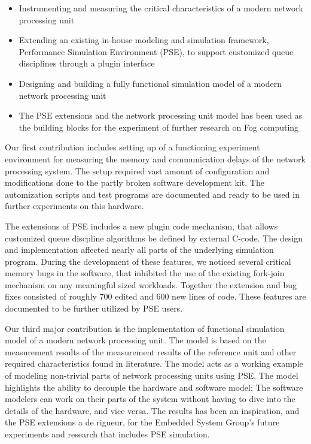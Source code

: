\begin{itemize}
\item Instrumenting and measuring the critical characteristics of a modern network processing unit
\item Extending an existing in-house modeling and simulation framework, Performance Simulation Environment (PSE), to support customized queue disciplines through a plugin interface %
\item Designing and building a fully functional simulation model of a modern network processing unit
\item The PSE extensions and the network processing unit model has been used as the building blocks for the experiment of further research on Fog computing
\end{itemize}

Our first contribution includes setting up of a functioning experiment environment for measuring the memory and communication delays of the network processing system. The setup required vast amount of configuration and modifications done to the partly broken software development kit. The automization scripts and test programs are documented and ready to be used in further experiments on this hardware.

The extensions of PSE includes a new plugin code mechanism, that allows customized queue discpline algorithms be defined by external C-code. The design and implementation affected nearly all parts of the underlying simulation program. During the development of these features, we noticed several critical memory bugs in the software, that inhibited the use of the existing fork-join mechanism on any meaningful sized workloads. Together the extension and bug fixes consisted of roughly 700 edited and 600 new lines of code. These features are documented to be further utilized by PSE users.

Our third major contribution is the implementation of functional simulation model of a modern network processing unit. The model is based on the measurement results of the measurement results of the reference unit and other required characteristics found in literature. The model acts as a working example of modeling non-trivial parts of network processing units using PSE. The model highlights the ability to decouple the hardware and software model; The software modelers can work on their parts of the system without having to dive into the details of the hardware, and vice versa. The results has been an inspiration, and the PSE extensions a de rigueur, for the Embedded System Group's future experiments and research that includes PSE simulation.

